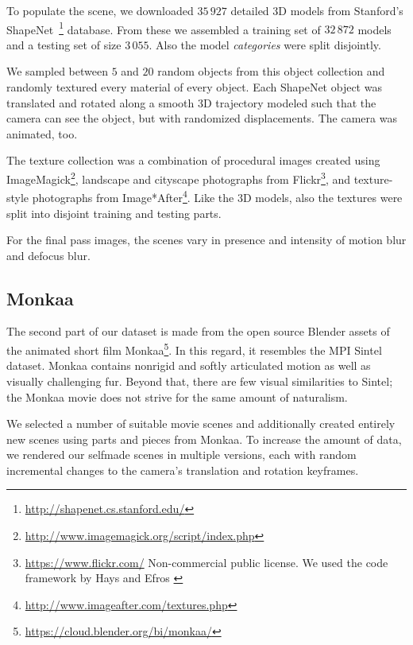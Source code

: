 \documentclass[10pt,twocolumn,letterpaper]{article}
\begin{document}
To populate the scene, we downloaded $35\,927$ detailed 3D models from Stanford's ShapeNet~\cite{Savva15}\footnote{\url{http://shapenet.cs.stanford.edu/}} database.
From these we assembled a training set of $32\,872$ models and a testing set of size $3\,055$.
Also the model \emph{categories} were split disjointly.

We sampled between $5$ and $20$ random objects from this object collection and randomly textured every material of every object.
Each ShapeNet object was translated and rotated along a smooth 3D trajectory modeled such that the camera can see the object, but with randomized displacements.
The camera was animated, too.

The texture collection was a combination of procedural images created using ImageMagick\footnote{\url{http://www.imagemagick.org/script/index.php}}, landscape and cityscape photographs from Flickr\footnote{\url{https://www.flickr.com/} Non-commercial public license. We used the code framework by Hays and Efros \cite{Hays-Efros-08}}, and texture-style photographs from Image*After\footnote{\url{http://www.imageafter.com/textures.php}}.
Like the 3D models, also the textures were split into disjoint training and testing parts.

For the final pass images, the scenes vary in presence and intensity of motion blur and defocus blur.

\subsection{Monkaa}\label{sec:monkaa}

The second part of our dataset is made from the open source Blender assets of the animated short film Monkaa\footnote{\url{https://cloud.blender.org/bi/monkaa/}}.
In this regard, it resembles the MPI Sintel dataset.
Monkaa contains nonrigid and softly articulated motion as well as visually challenging fur.
Beyond that, there are few visual similarities to Sintel; the Monkaa movie does not strive for the same amount of naturalism.

We selected a number of suitable movie scenes and additionally created entirely new scenes using parts and pieces from Monkaa.
To increase the amount of data, we rendered our selfmade scenes in multiple versions, each with random incremental changes to the camera's translation and rotation keyframes.

\end{document}
